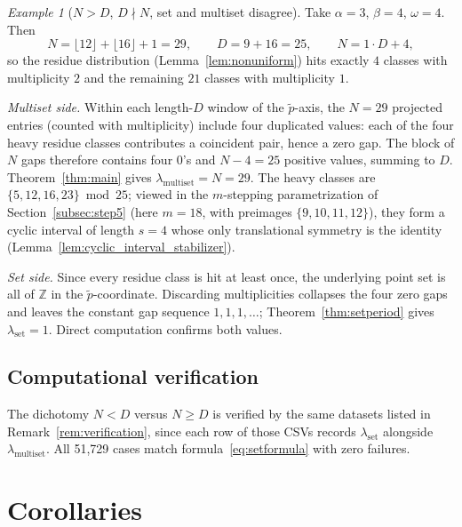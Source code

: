 \documentclass[11pt,reqno]{amsart}
\theoremstyle{plain}
\theoremstyle{definition}
\theoremstyle{remark}
\newtheorem{example}[theorem]{Example}
\begin{document}
\begin{example}[\(N > D\), \(D \nmid N\), set and multiset disagree]
\label{ex:set_gt}
Take \(\alpha = 3\), \(\beta = 4\), \(\omega = 4\).  Then
\[
    N = \lfloor 12 \rfloor + \lfloor 16 \rfloor + 1 = 29,
    \qquad
    D = 9 + 16 = 25,
    \qquad
    N = 1 \cdot D + 4,
\]
so the residue distribution
(Lemma~\ref{lem:nonuniform}) hits exactly \(4\) classes with
multiplicity \(2\) and the remaining \(21\) classes with
multiplicity \(1\).

\medskip
\noindent\emph{Multiset side.}  Within each length-\(D\) window of the
\(\tilde{p}\)-axis, the \(N = 29\) projected entries (counted with
multiplicity) include four duplicated values: each of the four
heavy residue classes contributes a coincident pair, hence a zero
gap.  The block of \(N\) gaps therefore contains four \(0\)'s and
\(N - 4 = 25\) positive values, summing to \(D\).
Theorem~\ref{thm:main} gives
\(\lambda_{\mathrm{multiset}} = N = 29\).  The heavy classes are
\(\{5, 12, 16, 23\} \bmod 25\); viewed in the \(m\)-stepping
parametrization of Section~\ref{subsec:step5} (here \(m = 18\),
with preimages \(\{9, 10, 11, 12\}\)), they form
a cyclic interval of length \(s = 4\) whose only translational
symmetry is the identity
(Lemma~\ref{lem:cyclic_interval_stabilizer}).

\medskip
\noindent\emph{Set side.}  Since every residue class is hit at least
once, the underlying point set is all of \(\mathbb{Z}\) in the
\(\tilde{p}\)-coordinate.  Discarding multiplicities collapses the four
zero gaps and leaves the constant gap sequence \(1, 1, 1, \ldots\);
Theorem~\ref{thm:setperiod} gives
\(\lambda_{\mathrm{set}} = 1\).  Direct computation confirms both
values.
\end{example}

\subsection{Computational verification}\label{subsec:set_empirical}

The dichotomy \(N < D\) versus \(N \ge D\) is verified by the same datasets
listed in Remark~\ref{rem:verification}, since each row of those CSVs
records \(\lambda_{\mathrm{set}}\) alongside \(\lambda_{\mathrm{multiset}}\).
All 51{,}729 cases match formula~\eqref{eq:setformula} with zero failures.

\section{Corollaries}\label{sec:corollaries}
\end{document}
